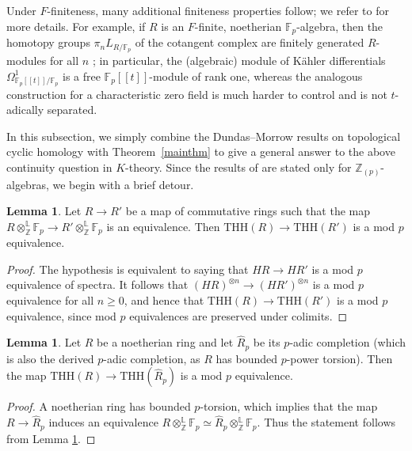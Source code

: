 \documentclass{amsart}
\newcommand{\THH}{\mathrm{THH}}
\theoremstyle{definition}
\newtheorem{lemma}[definition]{Lemma}
\newcommand{\lotimes}{\otimes^{\mathbb{L}}}
\newcommand{\bb}{\mathbb}
\newcommand{\dotimes}{\otimes^{\bb L}}
\begin{document}
Under $F$-finiteness, many additional finiteness properties follow; we refer to \cite{DundasMorrow} for more details. For
example, if $R$ is an $F$-finite, noetherian $\bb F_p$-algebra, then the homotopy groups  $\pi_nL_{R/\mathbb{F}_p}$ of the cotangent complex are finitely generated $R$-modules for all $n$ \cite[Cor. 3.8]{DundasMorrow}; in particular, the (algebraic) module of K\"ahler differentials $\Omega^1_{\bb F_p[[t]]/\bb F_p}$ is a free $\bb F_p[[t]]$-module of rank one, whereas the analogous construction for a characteristic zero field is much harder to control and is not $t$-adically separated.


In this subsection, we simply combine the Dundas--Morrow results on topological cyclic homology with
Theorem~\ref{mainthm} to give a general answer to the above continuity question in $K$-theory. Since the results of \cite{DundasMorrow} are stated only for $\mathbb{Z}_{(p)}$-algebras, we begin with
a brief detour. 


\begin{lemma} \label{modplemma0}
Let $R \to R'$ be a map of commutative rings such that the map $R
\lotimes_{\mathbb{Z}} \mathbb{F}_p \to R' \lotimes_{\mathbb{Z}} \mathbb{F}_p$ is
an equivalence. Then $\THH(R) \to \THH(R')$ is a mod $p$ equivalence.
\end{lemma} 
\begin{proof} 
The hypothesis is equivalent to saying that $HR\rightarrow HR'$ is a mod $p$
equivalence of spectra.  It follows that $(HR)^{\otimes n}\rightarrow
(HR')^{\otimes n}$ is a mod $p$ equivalence for all $n\geq 0$, and hence that
$\THH(R)\rightarrow \THH(R')$ is a mod $p$ equivalence, since mod $p$ equivalences are preserved under colimits.
\end{proof} 

\begin{lemma} 
\label{modplemma}
Let $R$ be a noetherian ring and let $\widehat{R}_p$ be its $p$-adic completion
(which is also the derived $p$-adic completion, as $R$ has bounded $p$-power
torsion). Then the map 
$\THH(R) \to  \THH(\widehat{R}_p)$ is a mod $p$ equivalence. 
\end{lemma} 
\begin{proof} 
A noetherian ring has bounded $p$-torsion, which implies that the map $R \to \widehat{R}_p$ induces an equivalence $R
\dotimes_\bb Z \mathbb{F}_p \simeq \widehat{R}_p \dotimes_\bb Z
\mathbb{F}_p$.  Thus the statement follows from Lemma \ref{modplemma0}.
\end{proof} 
\end{document}
